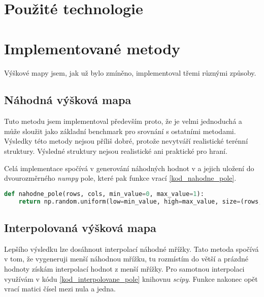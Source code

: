 \section{Použité technologie}



\section{Implementované metody}

Výškové mapy jsem, jak už bylo zmíněno, implementoval třemi různými způsoby.

\subsection{Náhodná výšková mapa}

Tuto metodu jsem implementoval především proto, že je velmi jednoduchá a může sloužit jako základní benchmark pro srovnání s ostatními metodami. Výsledky této metody nejsou příliš dobré, protože nevytváří realistické terénní struktury. Výsledné struktury nejsou realistické ani praktické pro hraní.

Celá implementace spočívá v generování náhodných hodnot v a jejich uložení do dvourozměrného \textit{numpy} pole, které pak funkce vrací \ref{kod_nahodne_pole}.


\begin{lstlisting}[language=Python, caption=Kód generující pole pro náhodnou mapu, label=kod_nahodne_pole]
def nahodne_pole(rows, cols, min_value=0, max_value=1):
    return np.random.uniform(low=min_value, high=max_value, size=(rows, cols))

\end{lstlisting}


\subsection{Interpolovaná výšková mapa}

Lepšího výsledku lze dosáhnout interpolací náhodné mřížky. Tato metoda spočívá v tom, že vygeneruji menší náhodnou mřížku, tu rozmístím do větší a prázdné hodnoty získám interpolací hodnot z menší mřížky. Pro samotnou interpolaci využívám v kódu \ref{kod_interpolovane_pole} knihovnu \textit{scipy}. Funkce nakonec opět vrací matici čísel mezi nula a jedna.

